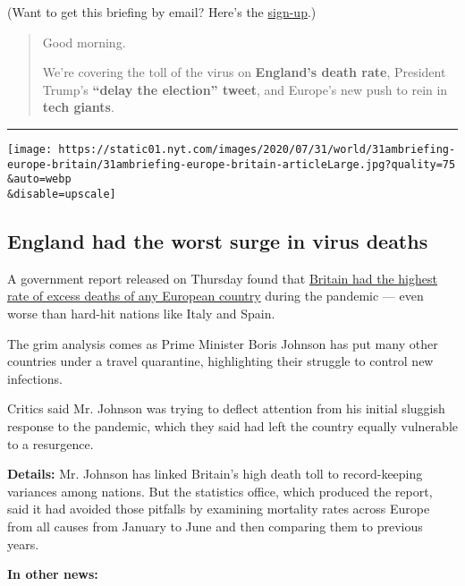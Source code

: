 (Want to get this briefing by email? Here's the
\href{https://www.nytimes.com/morning-briefing}{sign-up}.)

\begin{quote}
Good morning.

We're covering the toll of the virus on \textbf{England's death rate},
President Trump's \textbf{``delay the election'' tweet}, and Europe's
new push to rein in \textbf{tech giants}.
\end{quote}

\begin{center}\rule{0.5\linewidth}{\linethickness}\end{center}

\texttt{[image: https://static01.nyt.com/images/2020/07/31/world/31ambriefing-europe-britain/31ambriefing-europe-britain-articleLarge.jpg?quality=75\\\&auto=webp\\\&disable=upscale]}

\hypertarget{england-had-the-worst-surge-in-virus-deaths}{%
\subsection{England had the worst surge in virus
deaths}\label{england-had-the-worst-surge-in-virus-deaths}}

A government report released on Thursday found that
\href{https://www.nytimes.com/2020/07/30/world/europe/UK-deaths-coronavirus-europe.html}{Britain
had the highest rate of excess deaths of any European country} during
the pandemic --- even worse than hard-hit nations like Italy and Spain.

The grim analysis comes as Prime Minister Boris Johnson has put many
other countries under a travel quarantine, highlighting their struggle
to control new infections.

Critics said Mr. Johnson was trying to deflect attention from his
initial sluggish response to the pandemic, which they said had left the
country equally vulnerable to a resurgence.

\textbf{Details:} Mr. Johnson has linked Britain's high death toll to
record-keeping variances among nations. But the statistics office, which
produced the report, said it had avoided those pitfalls by examining
mortality rates across Europe from all causes from January to June and
then comparing them to previous years.

\textbf{In other news:}

